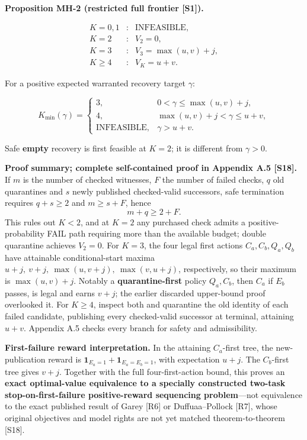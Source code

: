 \documentclass[
  10pt,
  american,
  a4paper,
]{article}
\begin{document}
\textbf{Proposition MH-2 (restricted full frontier {[}S1{]}).}

\[
\begin{array}{lll}
K=0,1 &: &\mathrm{INFEASIBLE},\\
K=2 &: &V_2=0,\\
K=3 &: &V_3=\max(u,v)+j,\\
K\ge4 &: &V_K=u+v .
\end{array}
\]

For a positive expected warranted recovery target \(\gamma\):

\[
K_{\min}(\gamma)=
\begin{cases}
3,&0<\gamma\le \max(u,v)+j,\\
4,&\max(u,v)+j<\gamma\le u+v,\\
\mathrm{INFEASIBLE},&\gamma>u+v.
\end{cases}
\]

Safe \textbf{empty} recovery is first feasible at \(K=2\); it is
different from \(\gamma>0\).

\textbf{Proof summary; complete self-contained proof in Appendix A.5
{[}S18{]}.} If \(m\) is the number of checked witnesses, \(F\) the
number of failed checks, \(q\) old quarantines and \(s\) newly published
checked-valid successors, safe termination requires \(q+s\ge2\) and
\(m\ge s+F\), hence \[
m+q\ge2+F.
\] This rules out \(K<2\), and at \(K=2\) any purchased check admits a
positive-probability FAIL path requiring more than the available budget;
double quarantine achieves \(V_2=0\). For \(K=3\), the four legal first
actions \(C_a,C_b,Q_a,Q_b\) have attainable conditional-start maxima
\(u+j,\ v+j,\ \max(u,v+j),\ \max(v,u+j)\), respectively, so their
maximum is \(\max(u,v)+j\). Notably a \textbf{quarantine-first} policy
\(Q_a,C_b\), then \(C_a\) if \(E_b\) passes, is legal and earns \(v+j\);
the earlier discarded upper-bound proof overlooked it. For \(K\ge4\),
inspect both and quarantine the old identity of each failed candidate,
publishing every checked-valid successor at terminal, attaining \(u+v\).
Appendix A.5 checks every branch for safety and admissibility.

\textbf{First-failure reward interpretation.} In the attaining
\(C_a\)-first tree, the new-publication reward is
\(\mathbf 1_{E_a=1}+\mathbf 1_{E_a=E_b=1}\), with expectation \(u+j\).
The \(C_b\)-first tree gives \(v+j\). Together with the full
four-first-action bound, this proves an \textbf{exact optimal-value
equivalence to a specially constructed two-task stop-on-first-failure
positive-reward sequencing problem}---not equivalence to the exact
published result of Garey {[}R6{]} or Duffuaa--Pollock {[}R7{]}, whose
original objectives and model rights are not yet matched
theorem-to-theorem {[}S18{]}.
\end{document}
